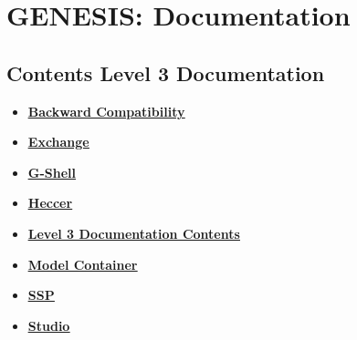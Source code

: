 \documentclass[12pt]{article}
\begin{document}
\section*{GENESIS: Documentation}

\subsection*{Contents Level 3 Documentation}

\begin{itemize}

\item \href{../tests-g2-backward-compatibility/tests-g2-backward-compatibility.pdf}{\bf \underline{Backward Compatibility}}

\item \href{../tests-exchange/tests-exchange.pdf}{\bf \underline{Exchange}}

\item \href{../tests-gshell/tests-gshell.pdf}{\bf \underline{G-Shell}}

\item \href{../tests-heccer/tests-heccer.pdf}{\bf \underline{Heccer}}

\item \href{../contents-level3/contents-level3.pdf}{\bf \underline{Level 3 Documentation Contents}}

\item \href{../tests-model-container/tests-model-container.pdf}{\bf \underline{Model Container}}

\item \href{../tests-ssp/tests-ssp.pdf}{\bf \underline{SSP}}

\item \href{../tests-studio/tests-studio.pdf}{\bf \underline{Studio}}


\end{itemize}

\end{document}
